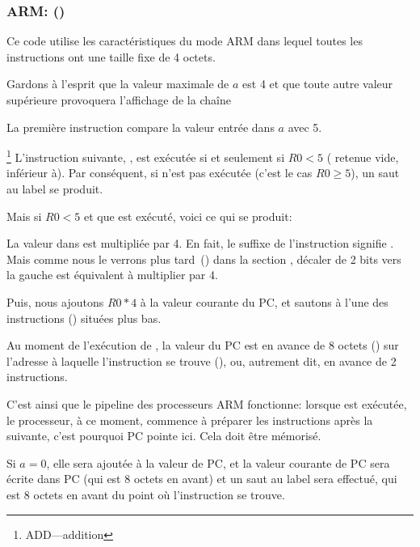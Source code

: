 \subsubsection{ARM: \OptimizingKeilVI (\ARMMode)}
\label{sec:SwitchARMLot}



Ce code utilise les caractéristiques du mode ARM dans lequel toutes les instructions
ont une taille fixe de 4 octets.

Gardons à l'esprit que la valeur maximale de $a$ est 4 et que toute autre valeur
supérieure provoquera l'affichage de la chaîne 

La première instruction  compare la valeur entrée dans $a$ avec 5.

\footnote{ADD---addition}
L'instruction suivante, , est exécutée si et seulement
si $R0 < 5$ ( retenue vide, inférieur à).
Par conséquent, si  n'est pas exécutée (c'est le cas $R0 \geq 5$), un
saut au label  se produit.

Mais si $R0 < 5$ et que  est exécuté, voici ce qui se produit:

La valeur dans  est multipliée par 4.
En fait, le suffixe de l'instruction  signifie .
Mais comme nous le verrons plus tard~() dans la section
\q{\ShiftsSectionName}, décaler de 2 bits vers la gauche est équivalent à multiplier
par 4.

Puis, nous ajoutons $R0*4$ à la valeur courante du \ac{PC}, et sautons à l'une
des instructions  () situées plus bas.

Au moment de l'exécution de , la valeur du \ac{PC} est en avance de 8
octets () sur l'adresse à laquelle l'instruction  se trouve
(), ou, autrement dit, en avance de 2 instructions.


C'est ainsi que le pipeline des processeurs ARM fonctionne: lorsque  est
exécutée, le processeur, à ce moment, commence à préparer les instructions après
la suivante, c'est pourquoi \ac{PC} pointe ici. Cela doit être mémorisé.

Si $a=0$, elle sera ajoutée à la valeur de \ac{PC}, et la valeur courante de \ac{PC}
sera écrite dans \ac{PC} (qui est 8 octets en avant) et un saut au label 
sera effectué, qui est 8 octets en avant du point où l'instruction se trouve.

